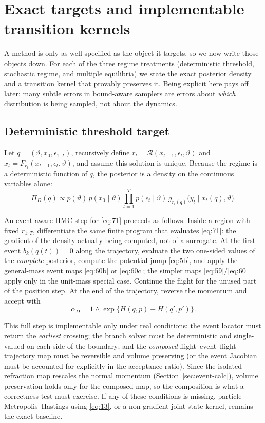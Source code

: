\documentclass[11pt]{article}
\begin{document}
\section{Exact targets and implementable transition kernels}\label{sec:targets}

A method is only as well specified as the object it targets, so we
now write those objects down. For each of the three regime treatments (deterministic
threshold, stochastic regime, and multiple equilibria) we state the exact
posterior density and a transition kernel that provably preserves it. Being
explicit here pays off later: many subtle errors in bound-aware samplers are
errors about \emph{which} distribution is being sampled, not about the
dynamics.

\subsection{Deterministic threshold target}\label{sec:target-det}

Let $q=(\vartheta,x_0,\epsilon_{1:T})$, recursively define
$r_t=\mathcal R(x_{t-1},\epsilon_t,\vartheta)$ and
$x_t=F_{r_t}(x_{t-1},\epsilon_t,\vartheta)$, and assume this solution is
unique. Because the regime is a deterministic function of $q$, the posterior is
a density on the continuous variables alone:
\begin{equation}\label{eq:71}
 \Pi_D(q)\propto p(\vartheta)\,p(x_0\mid\vartheta)
 \prod_{t=1}^T p(\epsilon_t\mid\vartheta)\,
 g_{r_t(q)}\bigl(y_t\mid x_t(q),\vartheta\bigr).
\end{equation}

An event-aware HMC step for \eqref{eq:71} proceeds as follows. Inside a region
with fixed $r_{1:T}$, differentiate the same finite program that evaluates
\eqref{eq:71}: the gradient of the density actually being computed, not of a
surrogate. At the first event $b_k(q(t))=0$ along the trajectory, evaluate the
two one-sided values of the \emph{complete} posterior, compute the potential
jump \eqref{eq:5b}, and apply the general-mass event maps \eqref{eq:60b} or
\eqref{eq:60c}; the simpler maps \eqref{eq:59}/\eqref{eq:60} apply only in the
unit-mass special case. Continue the flight for the unused part of the position
step. At the end of the trajectory, reverse the momentum and accept with
\begin{equation}\label{eq:72}
 \alpha_D=1\wedge\exp\{H(q,p)-H(q',p')\}.
\end{equation}

This full step is implementable only under real conditions: the event locator
must return the \emph{earliest} crossing; the branch solver must be
deterministic and single-valued on each side of the boundary; and the
\emph{composed} flight--event--flight trajectory map must be reversible and
volume preserving (or the event Jacobian must be accounted for explicitly in
the acceptance ratio). Since the isolated refraction map rescales the normal
momentum (Section~\ref{sec:event-calc}), volume preservation holds only for
the composed map, so the composition is what a correctness test must
exercise. If any of these conditions is missing, particle
Metropolis--Hastings using \eqref{eq:13}, or a non-gradient joint-state kernel,
remains the exact baseline.
\end{document}

